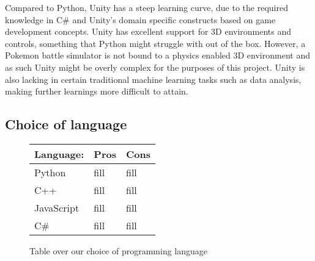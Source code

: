 Compared to Python, Unity has a steep learning curve,
due to the required knowledge in C\# and Unity's domain specific constructs based on game development concepts. Unity has excellent support for 3D environments and controls,
something that Python might struggle with out of the box. However, a Pokemon battle simulator is not bound to a physics enabled 3D environment and as such
Unity might be overly complex for the purposes of this project.
Unity is also lacking in certain traditional machine learning tasks such as data analysis, making further learnings more difficult to attain.  

\subsection{Choice of language}

\begin{figure}[h]
    \centering
    \begin{tabularx}{\textwidth}{ |X|X|X| }
          \hline
          Language:       & Pros & Cons \\
          \hline
          Python        & fill & fill \\
          \hline
          C++           & fill & fill \\
          \hline
          JavaScript    & fill & fill \\
          \hline 
          C\#           & fill & fill \\
          \hline
    \end{tabularx}
    \caption{Table over our choice of programming language}
    \label{tab:choice-of-language}      
\end{figure}
